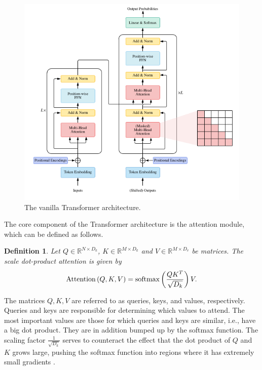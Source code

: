 \documentclass[magisterska,en]{pracamgr}
\newtheorem{defi}{Definition}[section]
\begin{document}
\begin{figure}[H]
\centering
\includegraphics[scale=0.5]{images/attention.png}
\caption{The vanilla Transformer architecture.}
\label{attention}
\end{figure}


The core component of the Transformer architecture is the attention module, which can be defined as follows.

\begin{defi}\label{attention_def}
    Let $Q \in \mathbb{R}^{N\times D_k}$, $K \in \mathbb{R}^{M\times D_k}$ and $V \in \mathbb{R}^{M\times D_v}$ be matrices. The scale dot-product attention is given by
        \begin{equation*}
        \normalfont
        \textrm{Attention} \left( Q, K, V \right) = \textrm{softmax}\left(\frac{QK^T}{\sqrt{D_k}} \right) V.  
    \end{equation*}

\end{defi}

The matrices $Q, K, V$ are referred to as queries, keys, and values, respectively. Queries and keys are responsible for determining which values to attend. The most important values are those for which queries and keys are similar, i.e., have a big dot product. They are in addition bumped up by the softmax function. The scaling factor $\frac{1}{\sqrt{D_k}}$ serves to counteract the effect that the dot product of $Q$ and $K$ grows large, pushing the softmax function into regions where it has extremely small gradients \cite{DBLP:conf/nips/VaswaniSPUJGKP17}.
\end{document}
